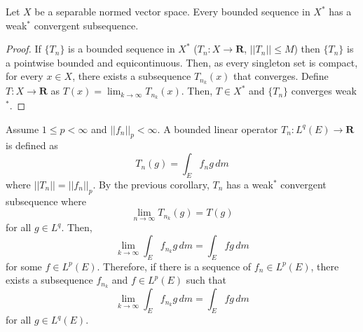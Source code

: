 \begin{cor}
Let $X$ be a separable normed vector space. Every bounded sequence in $X^{*}$ has a weak$^{*}$ convergent subsequence.
\end{cor}
\vspace{2ex}
\begin{proof}
If $\{T_{n}\}$ is a bounded sequence in $X^{*}$ ($T_{n}:X\rightarrow {\bm R}$, $||T_{n}||\leq M$) then $\{T_{n}\}$ is a pointwise bounded and equicontinuous. Then, as every singleton set is compact, for every $x\in X$, there exists a subsequence $T_{n_{k}}(x)$ that converges. Define $T:X\rightarrow {\bm R}$ as $T(x)=\lim _{k\rightarrow \infty }T_{n_{k}}(x)$. Then, $T\in X^{*}$ and $\{T_{n}\}$ converges weak$^{*}$.
\end{proof}
\vspace{2ex}
\begin{cor}
Assume $1\leq p<\infty $ and $||f_{n}||_{p}<\infty $. A bounded linear operator $T_{n}:L^{q}(E)\rightarrow {\bm R}$ is defined as
\[T_{n}(g)=\int _{E}f_{n}g\,d m\]
where $||T_{n}||=||f_{n}||_{p}$. By the previous corollary, $T_{n}$ has a weak$^{*}$ convergent subsequence where
\[\lim _{n\rightarrow \infty }T_{n_{k}}(g)=T(g)\]
for all $g\in L^{q}$. Then,
\[\lim _{k\rightarrow \infty }\int _{E}f_{n_{k}}g\,d m=\int _{E}fg\,d m\]
for some $f\in L^{p}(E)$. Therefore, if there is a sequence of $f_{n}\in L^{p}(E)$, there exists a subsequence $f_{n_{k}}$ and $f\in L^{p}(E)$ such that
\[\lim _{k\rightarrow \infty }\int _{E}f_{n_{k}}g\,d m=\int _{E}fg\,d m\]
for all $g\in L^{q}(E)$. 
\end{cor}
\vspace{2ex}


